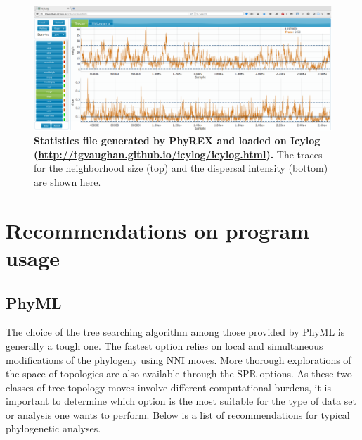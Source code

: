 \documentclass[a4paper,12pt]{article}
\begin{document}
\begin{figure}
\begin{center}
  \includegraphics[width=13.8cm]{./fig/phyrexlog}
\end{center}
\caption{{\bf Statistics file generated by PhyREX and loaded on Icylog
    (\url{http://tgvaughan.github.io/icylog/icylog.html}).} The traces for the neighborhood size
  (top) and
the dispersal intensity (bottom) are shown here.} 
\label{fig:phyrextrace}
\end{figure}

\section{Recommendations on program usage}\label{sec:progusage}

\subsection{PhyML}

The choice of the  tree searching algorithm among those provided by PhyML  is generally a tough one.
The  fastest option  relies  on local  and simultaneous  modifications  of the  phylogeny using  NNI
moves. More  thorough explorations of  the space  of topologies are  also available through  the SPR
options.  As these  two classes of tree topology moves involve  different computational burdens, it
is important to determine which option is the most suitable for the type of data set or analysis one
wants to perform. Below is a list of recommendations for typical phylogenetic analyses.
\end{document}
